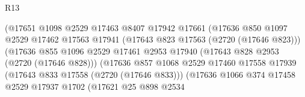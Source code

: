 \begin{lexlean}{R13}
\begin{coremodule}
                                                (@17651
                                                  @1098
                                                  @2529
                                                  @17463
                                                  @8407
                                                  @17942
                                                  @17661
                                                  (@17636
                                                    @850
                                                    @1097
                                                    @2529
                                                    @17462
                                                    @17563
                                                    @17941
                                                    (@17643 @823 @17563 (@2720 (@17646 @823)))
                                                    (@17636
                                                      @855
                                                      @1096
                                                      @2529
                                                      @17461
                                                      @2953
                                                      @17940
                                                      (@17643 @828 @2953 (@2720 (@17646 @828)))
                                                      (@17636
                                                        @857
                                                        @1068
                                                        @2529
                                                        @17460
                                                        @17558
                                                        @17939
                                                        (@17643 @833 @17558 (@2720 (@17646 @833)))
                                                        (@17636
                                                          @1066
                                                          @374
                                                          @17458
                                                          @2529
                                                          @17937
                                                          @1702
                                                          (@17621
                                                            @25
                                                            @898
                                                            @2534

\end{coremodule}
\end{lexlean}

